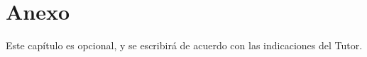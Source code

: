 \chapter*{Anexo}
Este capítulo es opcional, y se escribirá de acuerdo con las indicaciones del Tutor. 




 